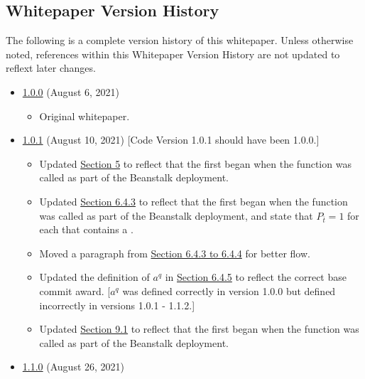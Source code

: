 \documentclass[class=article, crop=false]{standalone}
\begin{document}
\subsection{Whitepaper Version History}
The following is a complete version history of this whitepaper. Unless otherwise noted, references within this Whitepaper Version History are not updated to reflext later changes.

\begin{itemize}[topsep=0pt, itemsep=3pt,leftmargin=16pt]
    \item \href{https://github.com/BeanstalkFarms/Beanstalk/blob/master/version-history/beanstalk1_0_0.pdf}{1.0.0} (August 6, 2021)
    \begin{itemize}
        \item Original whitepaper.
    \end{itemize}
    \item \href{https://github.com/BeanstalkFarms/Beanstalk/blob/master/version-history/beanstalk1_0_1.pdf}{1.0.1} (August 10, 2021) [Code Version 1.0.1 should have been 1.0.0.]
    \begin{itemize}
        \item Updated \hyperlink{section.5}{Section 5} to reflect that the first  began when the  function was called as part of the Beanstalk deployment.
        \item Updated \hyperlink{subsubsection.6.4.3}{Section 6.4.3} to reflect that the first  began when the  function was called as part of the Beanstalk deployment, and state that $P_{\overline{t}} = 1$ for each  that contains a .
        \item Moved a paragraph from \hyperlink{subsubsection.6.4.3}{Section 6.4.3 to 6.4.4} for better flow.
        \item Updated the definition of $a^q$ in \hyperlink{subsubsection.6.4.5}{Section 6.4.5} to reflect the correct base commit award. [$a^q$ was defined correctly in version 1.0.0 but defined incorrectly in versions 1.0.1 - 1.1.2.]
        \item Updated \hyperlink{subsection.9.1}{Section 9.1} to reflect that the first  began when the  function was called as part of the Beanstalk deployment.
    \end{itemize}
    \item \href{https://github.com/BeanstalkFarms/Beanstalk/blob/master/version-history/beanstalk1_1_0.pdf}{1.1.0} (August 26, 2021)
    \begin{itemize}

\end{itemize}
\end{itemize}
\end{document}
